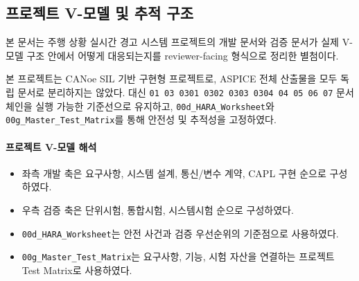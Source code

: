 \subsection*{프로젝트 V-모델 및 추적 구조}

본 문서는 주행 상황 실시간 경고 시스템 프로젝트의 개발 문서와 검증 문서가 실제 V-모델 구조 안에서 어떻게 대응되는지를 reviewer-facing 형식으로 정리한 별첨이다.

본 프로젝트는 CANoe SIL 기반 구현형 프로젝트로, ASPICE 전체 산출물을 모두 독립 문서로 분리하지는 않았다. 대신 \texttt{01 \textrightarrow{} 03 \textrightarrow{} 0301 \textrightarrow{} 0302 \textrightarrow{} 0303 \textrightarrow{} 0304 \textrightarrow{} 04 \textrightarrow{} 05 \textrightarrow{} 06 \textrightarrow{} 07} 문서 체인을 실행 가능한 기준선으로 유지하고, \texttt{00d\_HARA\_Worksheet}와 \texttt{00g\_Master\_Test\_Matrix}를 통해 안전성 및 추적성을 고정하였다.

\paragraph{프로젝트 V-모델 해석}
\begin{itemize}
\item 좌측 개발 축은 요구사항, 시스템 설계, 통신/변수 계약, CAPL 구현 순으로 구성하였다.
\item 우측 검증 축은 단위시험, 통합시험, 시스템시험 순으로 구성하였다.
\item \texttt{00d\_HARA\_Worksheet}는 안전 사건과 검증 우선순위의 기준점으로 사용하였다.
\item \texttt{00g\_Master\_Test\_Matrix}는 요구사항, 기능, 시험 자산을 연결하는 프로젝트 Test Matrix로 사용하였다.
\end{itemize}

